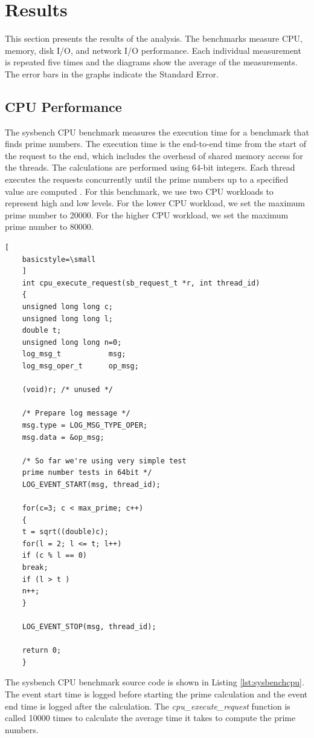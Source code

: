 \documentclass[11pt]{article}
\begin{document}
	\section{Results}
	This section presents the results of the analysis. The benchmarks measure CPU, memory, disk I/O, and network I/O performance. Each individual measurement is repeated five 
	times and the diagrams show the average of the measurements. The error bars in the graphs indicate the
	Standard Error. 
	
	\subsection{CPU Performance}
	The sysbench CPU benchmark measures the execution time for a benchmark that finds prime numbers. The execution time is the end-to-end time from the start of the request to the end, which includes the overhead of shared memory access for the threads. The calculations are performed using 64-bit integers. Each thread executes the requests concurrently until the prime numbers up to a specified value are computed \cite{kopytov}. For this benchmark, we use two CPU workloads to represent high and low levels. For the lower CPU workload, we set the maximum prime number to 20000. For the higher CPU workload, we set the maximum prime number to 80000. 
	
	\lstset{caption=Sysbench CPU Benchmark Source Code, label=lst:sysbenchcpu}
	\begin{lstlisting}[
	basicstyle=\small
	]
	int cpu_execute_request(sb_request_t *r, int thread_id)
	{
	unsigned long long c;
	unsigned long long l;
	double t;
	unsigned long long n=0;
	log_msg_t           msg;
	log_msg_oper_t      op_msg;
	
	(void)r; /* unused */
	
	/* Prepare log message */
	msg.type = LOG_MSG_TYPE_OPER;
	msg.data = &op_msg;
	
	/* So far we're using very simple test 
	prime number tests in 64bit */
	LOG_EVENT_START(msg, thread_id);
	
	for(c=3; c < max_prime; c++)  
	{
	t = sqrt((double)c);
	for(l = 2; l <= t; l++)
	if (c % l == 0)
	break;
	if (l > t )
	n++; 
	}
	
	LOG_EVENT_STOP(msg, thread_id);
	
	return 0;
	}
	\end{lstlisting}
	
	The sysbench CPU benchmark source code is shown in Listing \ref{lst:sysbenchcpu}. The event start time is logged before starting the prime calculation and the event end time is logged after the calculation. The \textit{cpu\_execute\_request} function is called 10000 times to calculate the average time it takes to compute the prime numbers. 
	
\end{document}
